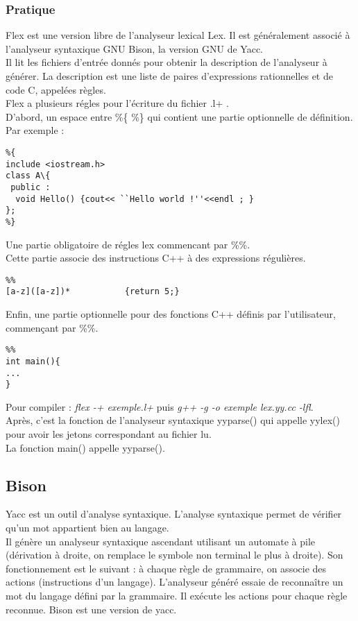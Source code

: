 \subsubsection{Pratique}
Flex est une version libre de l'analyseur lexical Lex. Il est généralement associé à l'analyseur syntaxique GNU Bison, la version GNU de Yacc. \\
Il lit les fichiers d'entrée donnés pour obtenir la description de l'analyseur à générer. La description est une liste de paires d'expressions rationnelles et de code C, appelées règles. \\
Flex a plusieurs régles pour l'écriture du fichier .l+ .\\
D'abord, un espace entre \%\{ \%\} qui contient une partie optionnelle de définition.\\
Par exemple :
\ \begin{verbatim}
%{
include <iostream.h>
class A\{ 
 public :
  void Hello() {cout<< ``Hello world !''<<endl ; }
};
%}
\end{verbatim}
Une partie obligatoire de régles lex commencant par \%\%.\\
Cette partie associe des instructions C++ à des expressions régulières.
\begin{verbatim}
%%
[a-z]([a-z])*           {return 5;}
\end{verbatim}
Enfin, une partie optionnelle pour des fonctions C++ définis par l'utilisateur, commençant par \%\%.\\
\begin{verbatim}
%%
int main(){
...
}
\end{verbatim}
Pour compiler : \textit{flex -+ exemple.l+}  puis \textit{g++ -g -o exemple lex.yy.cc -lfl}.\\
Après, c'est la fonction de l'analyseur syntaxique yyparse() qui appelle yylex() pour avoir les jetons correspondant au fichier lu.\\
La fonction main() appelle yyparse().\\


\subsection{Bison}

Yacc est un outil d'analyse syntaxique. L'analyse syntaxique permet de vérifier qu'un mot appartient bien au langage.\\ Il génère un analyseur syntaxique ascendant utilisant un automate à pile (dérivation à droite, on remplace le symbole non terminal le plus à droite).
 Son fonctionnement est le suivant : à chaque règle de grammaire, on associe des actions (instructions d'un langage). L'analyseur généré essaie de reconnaître un mot du langage défini par la grammaire. Il exécute les actions pour chaque règle reconnue.  Bison est une version de yacc.\\

